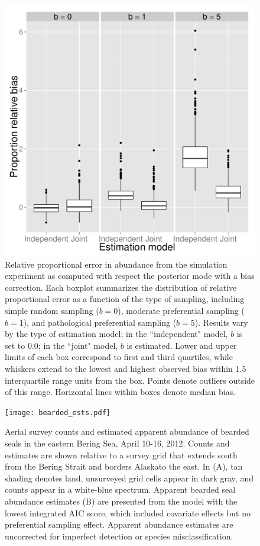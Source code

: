 \documentclass[times,mee,doublespace,]{besauth2}
\begin{document}
\begin{figure} %
\begin{center}
\includegraphics[width=170mm]{bias.pdf}
\caption{Relative proportional error in abundance from the simulation experiment as computed with respect the posterior mode with a bias correction. Each boxplot summarizes the distribution of relative proportional error as a function of the type of sampling, including simple random sampling ($b=0$), moderate preferential sampling ($b=1$), and pathological preferential sampling ($b=5$). Results vary by the type of estimation model; in the ``independent" model, $b$ is set to 0.0; in the ``joint" model, $b$ is estimated.  Lower and upper limits of each box correspond to first and third quartiles, while whiskers extend to the lowest and highest observed bias within 1.5 interquartile range units from the box.  Points denote outliers outside of this range.  Horizontal lines within boxes denote median bias.  }
\label{fig:sim_bias}
\end{center}
\end{figure}

\begin{figure} %
\begin{center}
\texttt{[image: bearded\_ests.pdf]}
\caption{Aerial survey counts and estimated apparent abundance of bearded seals in the eastern Bering Sea, April 10-16, 2012. Counts and estimates are shown relative to a survey grid that extends south from the Bering Strait and borders Alaskato the east. In (A), tan shading denotes land, unsurveyed grid cells appear in dark gray, and counts appear in a white-blue spectrum.  Apparent bearded seal abundance estimates (B) are presented from the model with the lowest integrated AIC score, which included covariate effects but no preferential sampling effect.  Apparent abundance estimates are uncorrected for imperfect detection or species misclassification.}
\label{fig:bearded_ests}
\end{center}
\end{figure}
\end{document}
